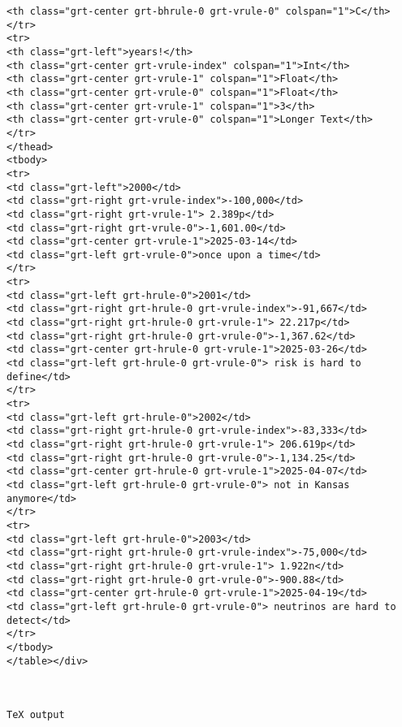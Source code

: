 \documentclass[
  11pt,
  a4paper,
  DIV=11,
  numbers=noendperiod]{scrartcl}
\begin{document}
\begin{verbatim}
<th class="grt-center grt-bhrule-0 grt-vrule-0" colspan="1">C</th>
</tr>
<tr>
<th class="grt-left">years!</th>
<th class="grt-center grt-vrule-index" colspan="1">Int</th>
<th class="grt-center grt-vrule-1" colspan="1">Float</th>
<th class="grt-center grt-vrule-0" colspan="1">Float</th>
<th class="grt-center grt-vrule-1" colspan="1">3</th>
<th class="grt-center grt-vrule-0" colspan="1">Longer Text</th>
</tr>
</thead>
<tbody>
<tr>
<td class="grt-left">2000</td>
<td class="grt-right grt-vrule-index">-100,000</td>
<td class="grt-right grt-vrule-1"> 2.389p</td>
<td class="grt-right grt-vrule-0">-1,601.00</td>
<td class="grt-center grt-vrule-1">2025-03-14</td>
<td class="grt-left grt-vrule-0">once upon a time</td>
</tr>
<tr>
<td class="grt-left grt-hrule-0">2001</td>
<td class="grt-right grt-hrule-0 grt-vrule-index">-91,667</td>
<td class="grt-right grt-hrule-0 grt-vrule-1"> 22.217p</td>
<td class="grt-right grt-hrule-0 grt-vrule-0">-1,367.62</td>
<td class="grt-center grt-hrule-0 grt-vrule-1">2025-03-26</td>
<td class="grt-left grt-hrule-0 grt-vrule-0"> risk is hard to define</td>
</tr>
<tr>
<td class="grt-left grt-hrule-0">2002</td>
<td class="grt-right grt-hrule-0 grt-vrule-index">-83,333</td>
<td class="grt-right grt-hrule-0 grt-vrule-1"> 206.619p</td>
<td class="grt-right grt-hrule-0 grt-vrule-0">-1,134.25</td>
<td class="grt-center grt-hrule-0 grt-vrule-1">2025-04-07</td>
<td class="grt-left grt-hrule-0 grt-vrule-0"> not in Kansas anymore</td>
</tr>
<tr>
<td class="grt-left grt-hrule-0">2003</td>
<td class="grt-right grt-hrule-0 grt-vrule-index">-75,000</td>
<td class="grt-right grt-hrule-0 grt-vrule-1"> 1.922n</td>
<td class="grt-right grt-hrule-0 grt-vrule-0">-900.88</td>
<td class="grt-center grt-hrule-0 grt-vrule-1">2025-04-19</td>
<td class="grt-left grt-hrule-0 grt-vrule-0"> neutrinos are hard to detect</td>
</tr>
</tbody>
</table></div>



TeX output



\end{verbatim}
\end{document}
